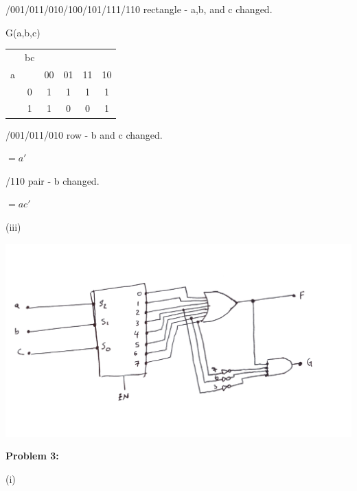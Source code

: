 \documentclass{article}
\begin{document}
    \quad\quad\quad{}/001/011/010/100/101/111/110 rectangle - a,b, and c changed.

    \quad\quad\quad\quad {}

    \quad\quad\quad G(a,b,c)

    \begin{center}
        \begin{tabular} {cc|cccc}
            & bc & &&& \\
            a && 00 & 01 & 11 & 10 \\
            \hline
            & 0 & 1 & 1 & 1 & 1 \\
            & 1 & 1 & 0 & 0 & 1 \\
        \end{tabular}
    \end{center}

    \quad\quad\quad{}/001/011/010 row - b and c changed.

    \quad\quad\quad\quad\quad $= a'$

    \quad\quad\quad{}/110 pair - b changed.

    \quad\quad\quad\quad\quad $= ac'$

    \quad\quad\quad\quad {}

    \quad\quad (iii)

    \begin{center}
        \includegraphics[width=\linewidth]{HW3_q2.png}
    \end{center}


    \textbf{Problem 3:}

    \quad\quad (i)
\end{document}
